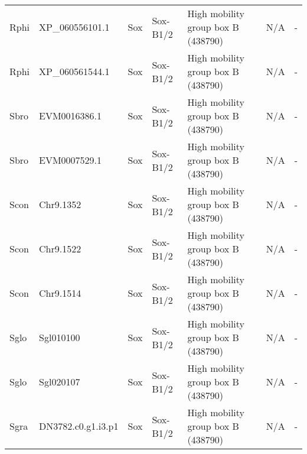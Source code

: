 \documentclass[../main.tex]{subfiles}
\begin{document}
\begin{landscape}
\begin{longtable}{lllllll}
		Rphi           & XP\_060556101.1       & Sox            & Sox-B1/2            & High mobility group box B (438790)          & N/A                                                                    & -                    \\
		Rphi           & XP\_060561544.1       & Sox            & Sox-B1/2            & High mobility group box B (438790)          & N/A                                                                    & -                    \\
		Sbro           & EVM0016386.1          & Sox            & Sox-B1/2            & High mobility group box B (438790)          & N/A                                                                    & -                    \\
		Sbro           & EVM0007529.1          & Sox            & Sox-B1/2            & High mobility group box B (438790)          & N/A                                                                    & -                    \\
		Scon           & Chr9.1352             & Sox            & Sox-B1/2            & High mobility group box B (438790)          & N/A                                                                    & -                    \\
		Scon           & Chr9.1522             & Sox            & Sox-B1/2            & High mobility group box B (438790)          & N/A                                                                    & -                    \\
		Scon           & Chr9.1514             & Sox            & Sox-B1/2            & High mobility group box B (438790)          & N/A                                                                    & -                    \\
		Sglo           & Sgl010100             & Sox            & Sox-B1/2            & High mobility group box B (438790)          & N/A                                                                    & -                    \\
		Sglo           & Sgl020107             & Sox            & Sox-B1/2            & High mobility group box B (438790)          & N/A                                                                    & -                    \\
		Sgra           & DN3782.c0.g1.i3.p1    & Sox            & Sox-B1/2            & High mobility group box B (438790)          & N/A                                                                    & -                    \\

\end{longtable}
\end{landscape}
\end{document}
